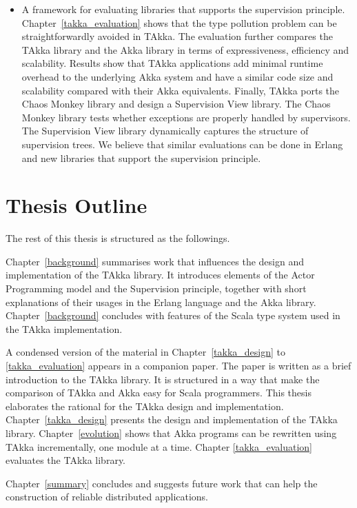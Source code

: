 \begin{itemize}
  
  \item A framework for evaluating libraries that supports the supervision 
  principle. Chapter~\ref{takka_evaluation} shows that the type pollution 
  problem can be straightforwardly avoided in TAkka.  The evaluation further 
  compares the TAkka library and the Akka library in terms of expressiveness, efficiency and 
  scalability. Results show that TAkka applications add minimal runtime overhead 
  to the underlying Akka system and have a similar code size and scalability 
  compared with their Akka equivalents. Finally, TAkka ports the Chaos Monkey 
  library and design a Supervision View library.  The Chaos Monkey library tests whether 
  exceptions are properly handled by supervisors.  The Supervision View library 
  dynamically captures the structure of supervision trees. We believe that similar 
  evaluations can be done in Erlang and new libraries that support the supervision 
  principle.
\begin{comment}  
  \item A model for analyzing the reliability and availability of 
  fault-tolerant systems that use the {\it reactive} mechanism (supervision) 
  and the {\it proactive} mechanism (software rejuvenation).  The novel model 
  (Chapter~\ref{rejuvenation_model}) overcomes the limitation of the classic 
  software rejuvenation model where the failure rate is treated as a constant
  and failure recovery is ironically treated as a stochastic process.  
  \mycomment{add new contributions once achieved}
  \mycomment{efficient approximate estimation}
  \mycomment{? the classic model is the least accurate approximation. ?}  
\end{comment}  
\end{itemize}

\section{Thesis Outline}

The rest of this thesis is structured as the followings.

Chapter~\ref{background} summarises work that influences the design and implementation
of the TAkka library.  It introduces elements of the Actor Programming model and the 
Supervision principle, together with short explanations of their usages in the Erlang 
language and the Akka library.  Chapter~\ref{background} concludes with features of the
Scala type system used in the TAkka implementation.   

A condensed version of the material in Chapter~\ref{takka_design} to \ref{takka_evaluation}
appears in a companion paper.  The paper \citep{TAKKA_paper} 
is written as a brief introduction to the TAkka library.  It
is structured in a way that make the comparison of TAkka and Akka easy for Scala programmers.
This thesis elaborates the rational for the TAkka design and implementation.   
Chapter~\ref{takka_design} presents the design and implementation of the TAkka library. 
Chapter~\ref{evolution} shows that Akka programs can be rewritten using TAkka incrementally, 
one module at a time.  Chapter \ref{takka_evaluation} evaluates the TAkka library.

Chapter~\ref{summary} concludes and suggests future work that can help the construction of reliable
distributed applications. 

